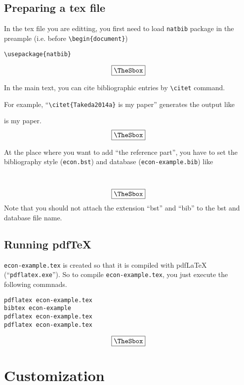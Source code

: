 \documentclass[10pt]{article}
\newenvironment{Frame}%
{\setlength{\fboxsep}{15pt}
\setlength{\mylength}{\linewidth}%
\addtolength{\mylength}{-2\fboxsep}%
\addtolength{\mylength}{-2\fboxrule}%
\Sbox
\minipage{\mylength}%
\setlength{\abovedisplayskip}{0pt}%
\setlength{\belowdisplayskip}{0pt}%
}%
{\endminipage\endSbox
\[\fbox{\TheSbox}\]}
\begin{document}
\subsection{Preparing a tex file}

In the tex file you are editting, you first need to load \texttt{natbib}
package in the preample (i.e. before \verb|\begin{document}|)
\begin{Frame}
\begin{verbatim}
\usepackage{natbib}
\end{verbatim}
\end{Frame}

In the main text, you can cite bibliographic entries by \verb|\citet|
command.

For example, ``\verb|\citet{Takeda2014a}| is my paper'' generates the output like
\begin{Frame}
\citet{Takeda2014a} is my paper.
\end{Frame}

At the place where you want to add ``the reference part'', you have to set the
bibliography style (\texttt{econ.bst}) and database (\texttt{econ-example.bib}) like
\begin{Frame}
\begin{verbatim}


\end{verbatim}
\end{Frame}
Note that you should not attach the extension ``bst'' and ``bib'' to the bst and
database file name.

\subsection{Running pdf\TeX{}}

\texttt{econ-example.tex} is created so that it is compiled with pdf\LaTeX
(``\texttt{pdflatex.exe}''). So to compile \texttt{econ-example.tex}, you just
execute the following commnads.
\begin{Frame}
\begin{verbatim}
pdflatex econ-example.tex
bibtex econ-example
pdflatex econ-example.tex
pdflatex econ-example.tex
\end{verbatim}
\end{Frame}

\section{Customization}
\end{document}
